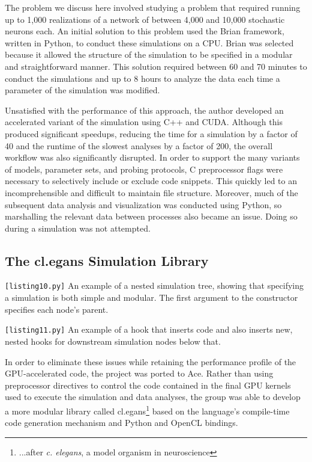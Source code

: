 \documentclass[9pt,preprint]{sigplanconf}
\begin{document}
The problem we discuss here involved studying a problem that required running up to 1,000 realizations of a network of between 4,000 and 10,000 stochastic neurons each. An initial solution to this problem used the Brian framework, written in Python, to conduct these simulations on a CPU. Brian was selected because it allowed the structure of the  simulation to be specified in a modular and straightforward manner. This solution required between 60 and 70 minutes to conduct the simulations and up to 8 hours to analyze the data each time a parameter of the simulation was modified.

Unsatisfied with the performance of this approach, the author developed an accelerated variant of the simulation using C++ and CUDA. Although this produced significant speedups, reducing the time for a simulation by a factor of 40 and the runtime of the slowest analyses by a factor of 200, the overall workflow was also significantly disrupted. In order to support the many variants of models, parameter sets, and probing protocols, C preprocessor flags were necessary to selectively include or exclude code snippets. This quickly led to an incomprehensible and difficult to maintain file structure. Moreover, much of the subsequent data analysis and visualization was conducted using Python, so marshalling the relevant data between processes also became an issue. Doing so during a simulation was not attempted.

\subsection{The {\sf cl.egans} Simulation Library}


\begin{codelisting}

\caption{\texttt{[listing10.py]} An example of a nested simulation tree, showing that specifying a simulation is both simple and modular. The first argument to the constructor specifies each node's parent.}
\label{spec}
\end{codelisting}

\begin{codelisting}

\caption{\texttt{[listing11.py]} An example of a hook that inserts code and also inserts new, nested hooks for downstream simulation nodes  below that.}
\label{impl}
\end{codelisting}

In order to eliminate these issues while retaining the performance profile of the GPU-accelerated code, the project was ported to Ace. Rather than using preprocessor directives to control the code contained in the final GPU kernels used to execute the simulation and data analyses, the group was able to develop a more modular  library called {\sf cl.egans}\footnote{...after {\it c. elegans}, a model organism in neuroscience} based on the language's compile-time code generation mechanism and Python and OpenCL bindings.
\end{document}
